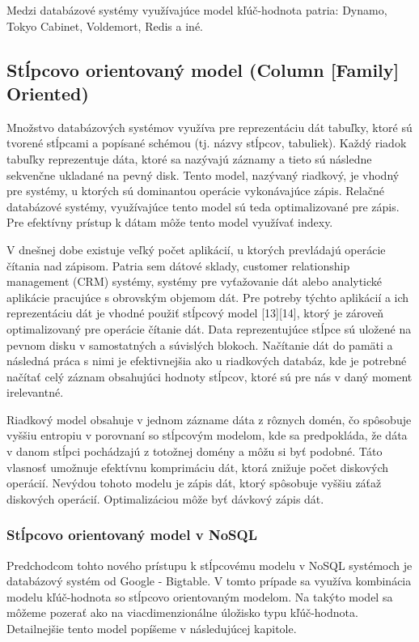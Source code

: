 \documentclass[11pt,twoside,a4paper]{book}
\begin{document}
Medzi databázové systémy využívajúce model kľúč-hodnota patria: Dynamo, Tokyo Cabinet, Voldemort, Redis a iné.

\subsection{Stĺpcovo orientovaný model (Column [Family] Oriented)}

Množstvo databázových systémov využíva pre reprezentáciu dát tabuľky, ktoré sú tvorené stĺpcami a popísané schémou (tj. názvy stĺpcov, tabuliek). Každý riadok tabuľky reprezentuje dáta, ktoré sa nazývajú záznamy a tieto sú následne sekvenčne ukladané na pevný disk. Tento model, nazývaný riadkový, je vhodný pre systémy, u ktorých sú dominantou operácie vykonávajúce zápis. Relačné databázové systémy, využívajúce tento model sú teda optimalizované pre zápis. Pre efektívny prístup k dátam môže tento model využívať indexy.

V dnešnej dobe existuje veľký počet aplikácií, u ktorých prevládajú operácie čítania nad zápisom. Patria sem dátové sklady, customer relationship management (CRM) systémy, systémy pre vyťažovanie dát alebo analytické aplikácie pracujúce s obrovským objemom dát. Pre potreby týchto aplikácií a ich reprezentáciu dát je vhodné použiť stĺpcový model [13][14], ktorý je zároveň optimalizovaný pre operácie čítanie dát. Data reprezentujúce stĺpce sú uložené na pevnom disku v samostatných a súvislých blokoch. Načítanie dát do pamäti a následná práca s nimi je efektivnejšia ako u riadkových databáz, kde je potrebné načítať celý záznam obsahujúci hodnoty stĺpcov, ktoré sú pre nás v daný moment irelevantné.

Riadkový model obsahuje v jednom zázname dáta z rôznych domén, čo spôsobuje vyššiu entropiu v porovnaní so stĺpcovým modelom, kde sa predpokláda, že dáta v danom stĺpci pochádzajú z totožnej domény a môžu si byť podobné. Táto vlasnosť umožnuje efektívnu komprimáciu dát, ktorá znižuje počet diskových operácií. Nevýdou tohoto modelu je zápis dát, ktorý spôsobuje vyššiu záťaž diskových operácií. Optimalizáciou môže byť dávkový zápis dát.

\subsubsection{Stĺpcovo orientovaný model v NoSQL}
Predchodcom tohto nového prístupu k stĺpcovému modelu v NoSQL systémoch je databázový systém od Google - Bigtable. V tomto prípade sa využíva kombinácia modelu kľúč-hodnota so stĺpcovo orientovaným modelom. Na takýto model sa môžeme pozerať ako na viacdimenzionálne úložisko typu kľúč-hodnota. Detailnejšie tento model popíšeme v následujúcej kapitole.
\end{document}
